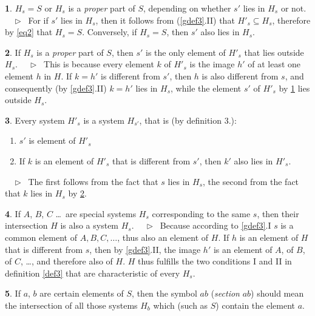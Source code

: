 \documentclass[leqno,hidelinks]{article}
\theoremstyle{definition}
\newtheorem{satz}{\protect\satzname}
\newtheorem{deff}[satz]{\protect\deffname}
\newcommand{\satzname}{}
\newcommand{\deffname}{}
\renewcommand{\satzname}{\hspace{-4pt}.\ Satz}%
\renewcommand{\deffname}{\hspace{-4pt}.\ Definition}%
\renewcommand{\satzname}{\hspace{-4pt}.\ Theorem}%
\renewcommand{\deffname}{\hspace{-4pt}.\ Definition}%
\newcommand\Beweis{\medskip \newline $ \phantom{'.'} \rhd \ $}%
\newcommand\beweis{ $ \phantom{'.'} \rhd \ $}%
\newcommand{\partof}{\subseteq}
\newcommand{\sref}[1]{\underline{\ref{#1}}}%
\begin{document}
\begin{paracol}{2}
\begin{satz}\label{thm5}
$H_s = S$ or $H_s$ is a \textit{proper} part of $S$, depending on whether
$s'$ lies in $H_s$ or not.
\Beweis
For if $s'$ lies in $H_s$, then it follows from (\sref{gdef3}{\color{ultrav}.II)}
that $H'_s \partof H_s$, therefore by \eqref{eq2} that $H_s = S$. Conversely,
if $H_s = S$, then $s'$ also lies in $H_s$.
\end{satz}

\begin{satz}\label{thm6}
If $H_s$ is a \emph{proper} part of $S$, then $s'$ is the only element of
$H'_s$ that lies outside $H_s$.
\Beweis
This is because every element $k$ of $H'_s$ is the image $h'$ of at least one
element $h$ in $H$. If $k=h'$ is different from $s'$, then $h$ is also different
from $s$, and consequently (by \sref{gdef3}{\color{ultrav}.II)} $k = h'$ lies in
$H_s$, while the element $s'$ of $H'_s$ by \sref{thm5} lies outside $H_s$.
\end{satz}

\begin{satz}\label{thm7}
Every system $H'_s$ is a system $H_{s'}$, that is (by definition 3.):
\begin{enumerate}[I'.]
	\item $s'$ is element of $H'_s$
	\item If $k$ is an element of $H'_s$ that is different from $s'$, then $k'$
    also lies in $H'_s$.
\end{enumerate}
\beweis
The first follows from the fact that $s$ lies in $H_s$, the second from the fact
that $k$ lies in $H_s$ by \sref{thm6}.
\end{satz}

\begin{satz}\label{thm8}
If $A$, $B$, $C$ \ldots\ are special systems $H_s$ corresponding to the same $s$,
then their intersection $H$ is also a system $H_s$.
\Beweis
Because according to \sref{gdef3}{\color{ultrav}.I} $s$ is a common element of
$A, B, C, \ldots$, thus also an element of $H$. If $h$ is an element of $H$ that
is different from $s$, then by \sref{gdef3}{\color{ultrav}.II}, the image $h'$
is an element of $A$, of $B$, of $C$, \ldots, and therefore also of $H$. $H$ thus
fulfills the two conditions I and II in definition \sref{def3} that are
characteristic of every $H_s$.
\end{satz}

\begin{deff}\label{def9}
If $a$, $b$ are certain elements of $S$, then the symbol $ab$ (\emph{section} $ab$)
should mean the intersection of all those systems $H_b$ which (such as $S$)
contain the element $a$.%
\end{deff}


\end{paracol}
\end{document}
